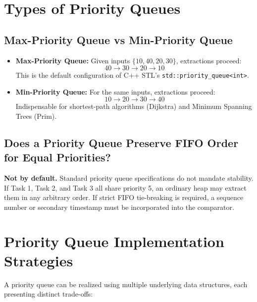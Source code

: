 \section{Types of Priority Queues}

\subsection{Max-Priority Queue vs Min-Priority Queue}

\begin{itemize}
    \item \textbf{Max-Priority Queue:} Given inputs $\{10, 40, 20, 30\}$, extractions proceed:
    \[
    40 \longrightarrow 30 \longrightarrow 20 \longrightarrow 10
    \]
    This is the default configuration of C++ STL's \texttt{std::priority\_queue<int>}.
    \item \textbf{Min-Priority Queue:} For the same inputs, extractions proceed:
    \[
    10 \longrightarrow 20 \longrightarrow 30 \longrightarrow 40
    \]
    Indispensable for shortest-path algorithms (Dijkstra) and Minimum Spanning Trees (Prim).
\end{itemize}

\subsection{Does a Priority Queue Preserve FIFO Order for Equal Priorities?}

\textbf{Not by default.} Standard priority queue specifications do not mandate stability. If Task 1, Task 2, and Task 3 all share priority 5, an ordinary heap may extract them in any arbitrary order. If strict FIFO tie-breaking is required, a sequence number or secondary timestamp must be incorporated into the comparator.

\section{Priority Queue Implementation Strategies}

A priority queue can be realized using multiple underlying data structures, each presenting distinct trade-offs:

